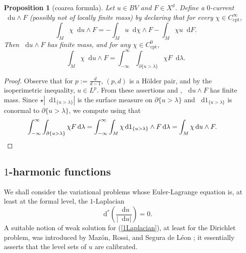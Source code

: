 \documentclass[reqno,11pt]{amsart}
\newcommand*\dif{\mathop{}\!\mathrm{d}}
\newcommand{\cpt}{\mathrm{cpt}}
\newtheorem{proposition}[theorem]{Proposition}
\theoremstyle{definition}
\numberwithin{equation}{section}
\begin{document}
\begin{proposition}[coarea formula]
Let $u \in BV$ and $F \in X^d$.
Define a $0$-current $\dif u \wedge F$ (possibly not of locally finite mass) by declaring that for every $\chi \in C^\infty_\cpt$,
$$\int_M \chi \dif u \wedge F = -\int_M u \dif \chi \wedge F - \int_M \chi u \dif F.$$
Then $\dif u \wedge F$ has finite mass, and for any $\chi \in C^0_\cpt$,
\begin{equation}\label{coarea formula}
\int_M \chi \dif u \wedge F = \int_{-\infty}^\infty \int_{\partial \{u > \lambda\}} \chi F \dif \lambda.
\end{equation}
\end{proposition}
\begin{proof}
Observe that for $p := \frac{d}{d - 1}$, $(p, d)$ is a H\"older pair, and by the isoperimetric inequality, $u \in L^p$.
From these assertions and \cite[Theorem 1.5]{Anzellotti1983}, $\dif u \wedge F$ has finite mass.
Since $\star|\dif 1_{\{u > \lambda\}}|$ is the surface measure on $\partial \{u > \lambda\}$ and $\dif 1_{\{u > \lambda\}}$ is conormal to $\partial \{u > \lambda\}$, we compute using \cite[Proposition 2.7(ii)]{Anzellotti1983} that
\begin{align*}
\int_{-\infty}^\infty \int_{\partial \{u > \lambda\}} \chi F \dif \lambda = \int_{-\infty}^\infty \int_M \chi \dif 1_{\{u > \lambda\}} \wedge F \dif \lambda &= \int_M \chi \dif u \wedge F. \qedhere 
\end{align*}
\end{proof}

\subsection{\texorpdfstring{$1$-harmonic functions}{One-harmonic functions}}
We shall consider the variational problems whose Euler-Lagrange equation is, at least at the formal level, the $1$-Laplacian
\begin{equation}\label{1Laplacian}
\dif^*\left(\frac{\dif u}{|\dif u|}\right) = 0.
\end{equation}
A suitable notion of weak solution for (\ref{1Laplacian}), at least for the Dirichlet problem, was introduced by Maz\'on, Rossi, and Segura de L\'eon \cite{Mazon14}; it essentially asserts that the level sets of $u$ are calibrated.
\end{document}
